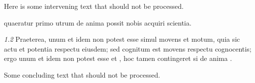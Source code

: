 \documentclass[a4paper, 12pt]{book}
\newcommand{\metatext}[1]{<#1>}
\newcommand{\no}[1]{\emph{#1}\quad}
\begin{document}
\begin{latin}
\endnumbering

Here is some intervening text that should not be processed.

\beginnumbering

\pstart[\subsection*{\metatext{De scientia}}]
%
%
quaeratur
primo utrum de anima possit nobis acquiri scientia.
\pend

\pstart
{}%
\no{1.2}
Praeterea, unum et idem non potest esse simul movens et motum,
quia sic  actu et potentia respectu
eiusdem; sed cognitum est movens respectu cognocentis; ergo unum et idem non
potest esse  et
, hoc tamen
contingeret si de anima .
\pend

\endnumbering

Some concluding text that should not be processed.

\end{latin}
\end{document}
